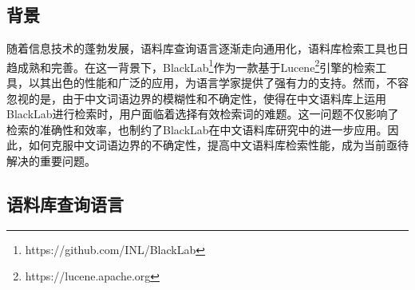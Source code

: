 \documentclass[11pt]{article}
\begin{document}
\begin{CJK*}{UTF8}{gbsn}
%
%
%
%

%
%

\section{背景}
\label{backgound}

随着信息技术的蓬勃发展，语料库查询语言逐渐走向通用化，语料库检索工具也日趋成熟和完善。在这一背景下，BlackLab\footnote[1]{https://github.com/INL/BlackLab}作为一款基于Lucene\footnote[2]{https://lucene.apache.org}引擎的检索工具，以其出色的性能和广泛的应用，为语言学家提供了强有力的支持。然而，不容忽视的是，由于中文词语边界的模糊性和不确定性，使得在中文语料库上运用BlackLab进行检索时，用户面临着选择有效检索词的难题。这一问题不仅影响了检索的准确性和效率，也制约了BlackLab在中文语料库研究中的进一步应用。因此，如何克服中文词语边界的不确定性，提高中文语料库检索性能，成为当前亟待解决的重要问题。

\subsection{语料库查询语言}


\end{CJK*}
\end{document}
